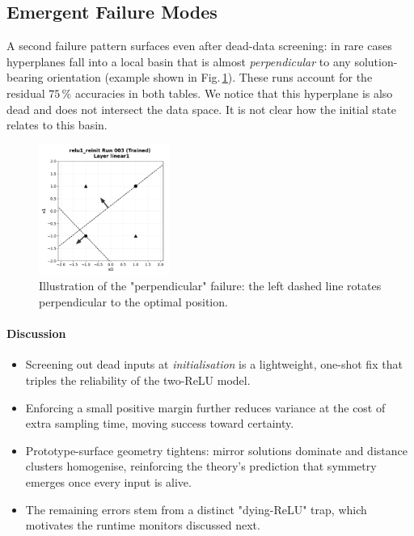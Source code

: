 \subsection*{Emergent Failure Modes}
A second failure pattern surfaces even after dead-data screening:
in rare cases hyperplanes fall into a local basin that is almost
\emph{perpendicular} to any solution-bearing orientation (example shown in Fig.\,\ref{fig:reinit-bad}).
These runs account for the residual $75\,\%$ accuracies in both tables. 
We notice that this hyperplane is also dead and does not intersect the data space.
It is not clear how the initial state relates to this basin.

\begin{figure}[ht]
  \centering
  \includegraphics[width=0.38\textwidth]{relu1/figs/reinit_bad_example.pdf}
  \caption{Illustration of the "perpendicular" failure: the left dashed
           line rotates perpendicular to the optimal position.}
  \label{fig:reinit-bad}
\end{figure}

\paragraph{Discussion}
\begin{itemize}
  \item Screening out dead inputs at \emph{initialisation} is a
        lightweight, one-shot fix that triples the reliability of the
        two-ReLU model.
  \item Enforcing a small positive margin further reduces variance at the
        cost of extra sampling time, moving success toward certainty.
  \item Prototype-surface geometry tightens: mirror solutions dominate
        and distance clusters homogenise, reinforcing the theory's
        prediction that symmetry emerges once every input is alive.
  \item The remaining errors stem from a distinct "dying-ReLU" 
        trap, which motivates the runtime monitors discussed next.
\end{itemize}

\hrulefill
